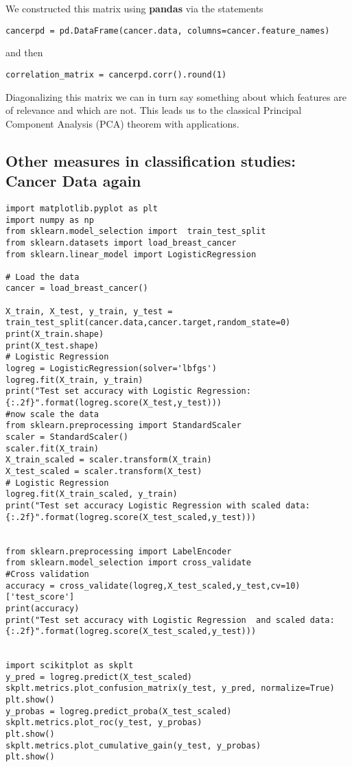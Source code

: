 \documentclass[%
oneside,                 %
final,                   %
10pt]{article}
\begin{document}
We constructed this matrix using \textbf{pandas} via the statements
\begin{verbatim}
cancerpd = pd.DataFrame(cancer.data, columns=cancer.feature_names)
\end{verbatim}
and then
\begin{verbatim}
correlation_matrix = cancerpd.corr().round(1)
\end{verbatim}

Diagonalizing this matrix we can in turn say something about which
features are of relevance and which are not. This leads  us to
the classical Principal Component Analysis (PCA) theorem with
applications. 



\subsection*{Other measures in classification studies: Cancer Data  again}
\begin{verbatim}
import matplotlib.pyplot as plt
import numpy as np
from sklearn.model_selection import  train_test_split 
from sklearn.datasets import load_breast_cancer
from sklearn.linear_model import LogisticRegression

# Load the data
cancer = load_breast_cancer()

X_train, X_test, y_train, y_test = train_test_split(cancer.data,cancer.target,random_state=0)
print(X_train.shape)
print(X_test.shape)
# Logistic Regression
logreg = LogisticRegression(solver='lbfgs')
logreg.fit(X_train, y_train)
print("Test set accuracy with Logistic Regression: {:.2f}".format(logreg.score(X_test,y_test)))
#now scale the data
from sklearn.preprocessing import StandardScaler
scaler = StandardScaler()
scaler.fit(X_train)
X_train_scaled = scaler.transform(X_train)
X_test_scaled = scaler.transform(X_test)
# Logistic Regression
logreg.fit(X_train_scaled, y_train)
print("Test set accuracy Logistic Regression with scaled data: {:.2f}".format(logreg.score(X_test_scaled,y_test)))


from sklearn.preprocessing import LabelEncoder
from sklearn.model_selection import cross_validate
#Cross validation
accuracy = cross_validate(logreg,X_test_scaled,y_test,cv=10)['test_score']
print(accuracy)
print("Test set accuracy with Logistic Regression  and scaled data: {:.2f}".format(logreg.score(X_test_scaled,y_test)))


import scikitplot as skplt
y_pred = logreg.predict(X_test_scaled)
skplt.metrics.plot_confusion_matrix(y_test, y_pred, normalize=True)
plt.show()
y_probas = logreg.predict_proba(X_test_scaled)
skplt.metrics.plot_roc(y_test, y_probas)
plt.show()
skplt.metrics.plot_cumulative_gain(y_test, y_probas)
plt.show()

\end{verbatim}
\end{document}
